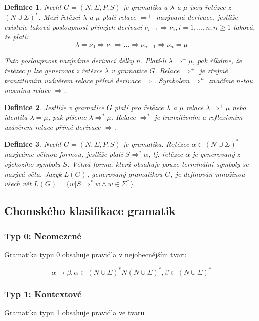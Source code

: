 \documentclass[a4paper, 11pt]{report}
\newtheorem{mydef}{Definice}[chapter]
\begin{document}
\begin{mydef}
Nechť $G = (N, \Sigma, P, S)$ je gramatika a $\lambda$ a $\mu$ jsou řetězce z $(N \cup \Sigma)^*$. Mezi řetězci $\lambda$ a $\mu$ platí relace $\Rightarrow^+$ nazývaná \emph{derivace}, jestliže existuje taková posloupnost přímých derivací $\nu_{i-1} \Rightarrow \nu_i, i = 1, \dots, n, n \geq 1$ taková, že platí:
$$\lambda = \nu_0 \Rightarrow \nu_1 \Rightarrow \dots \Rightarrow \nu_{n-1} \Rightarrow \nu_n = \mu$$

Tuto posloupnost nazýváme \emph{derivací délky $n$}. Platí-li $\lambda \Rightarrow^+ \mu$, pak říkáme, že řetězec $\mu$ lze generovat z řetězce $\lambda$ v gramatice $G$. Relace $\Rightarrow^+$ je zřejmě tranzitivním uzávěrem relace přímé derivace $\Rightarrow$. Symbolem $\Rightarrow^n$ značíme $n$-tou mocninu relace $\Rightarrow$.
\end{mydef}

\begin{mydef}
Jestliže v gramatice $G$ platí pro řetězce $\lambda$ a $\mu$ relace $\lambda \Rightarrow^+ \mu$ nebo identita $\lambda = \mu$, pak píšeme $\lambda \Rightarrow^* \mu$. Relace $\Rightarrow^*$ je tranzitivním a reflexivním uzávěrem relace přímé derivace $\Rightarrow$.
\end{mydef}

\begin{mydef}
Nechť $G=(N, \Sigma, P, S)$ je gramatika. Řetězec $\alpha \in (N \cup \Sigma)^*$ nazýváme \emph{větnou formou}, jestliže platí $S \Rightarrow^* \alpha$, tj. řetězec $\alpha$ je generovaný z výchozího symbolu $S$.
Větná forma, která obsahuje pouze terminální symboly se nazývá \emph{věta}. Jazyk $L(G)$, generovaný gramatikou $G$, je definován množinou všech vět $L(G) = \{ w | S \Rightarrow^* w \land w \in \Sigma^*\}$.
\end{mydef}

\subsection{Chomského klasifikace gramatik}
\subsubsection{Typ 0: Neomezené}
Gramatika typu 0 obsahuje pravidla v nejobecnějším tvaru

$$\alpha \to \beta, \alpha \in (N \cup \Sigma)^* N (N \cup \Sigma)^*, \beta \in (N \cup \Sigma)^*$$

\subsubsection{Typ 1: Kontextové}
Gramatika typu 1 obsahuje pravidla ve tvaru
\end{document}
